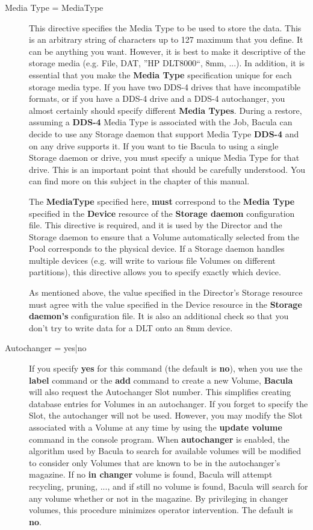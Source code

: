 \begin{description}
\item [Media Type = \lt{}MediaType\gt{}]
   This directive specifies the  Media Type to be used to store the data. This is
an arbitrary  string of characters up to 127 maximum that you define. It can 
be anything you want. However, it is best to  make it descriptive of the
storage media (e.g. File, DAT, ''HP  DLT8000``, 8mm, ...). In addition, it is
essential that you  make the {\bf Media Type} specification unique for each
storage  media type. If you have two DDS-4 drives that have incompatible 
formats, or if you have a DDS-4 drive and a DDS-4 autochanger,  you almost
certainly should specify different {\bf Media Types}.  During a restore,
assuming a {\bf DDS-4} Media Type is associated  with the Job, Bacula can
decide to use any Storage  daemon that support Media Type {\bf DDS-4} and on
any drive  supports it. If you want to tie Bacula to using a single Storage 
daemon or drive, you must specify a unique Media Type for that drive.  This is
an important point that should be carefully understood. You  can find more on
this subject in the 
 chapter of this
manual.  

The {\bf MediaType} specified here, {\bf must}  correspond to the {\bf Media
Type} specified in the {\bf Device}  resource of the {\bf Storage daemon}
configuration file.  This directive is required, and it is used by the
Director and the  Storage daemon to ensure that a Volume automatically
selected from  the Pool corresponds to the physical device. If a Storage
daemon  handles multiple devices (e.g. will write to various file Volumes  on
different partitions), this directive allows you to specify exactly  which
device.  

As mentioned above, the value specified in the Director's Storage  resource
must agree with the value specified in the Device resource in  the {\bf
Storage daemon's} configuration file. It is also an  additional check so  that
you don't try to write data for a DLT onto an 8mm device. 
\label{Autochanger1}

\item [Autochanger = \lt{}yes|no\gt{}]  
   If you specify {\bf yes}  for this command (the default is {\bf no}), when you
use the {\bf label}  command or the {\bf add} command to create a new Volume,
{\bf Bacula}  will also request the Autochanger Slot number. This simplifies 
creating database entries for Volumes in an autochanger. If you forget  to
specify the Slot, the autochanger will not be used. However, you  may modify
the Slot associated with a Volume at any time  by using the {\bf update
volume} command in the console program.  When {\bf autochanger} is enabled,
the algorithm used by  Bacula to search for available volumes will be modified
to  consider only Volumes that are known to be in the autochanger's  magazine.
If no {\bf in changer} volume is found, Bacula will  attempt recycling,
pruning, ..., and if still no volume is found,  Bacula will search for any
volume whether or not in the magazine.  By privileging in changer volumes,
this procedure minimizes  operator intervention.  The default is {\bf no}.  


\end{description}
